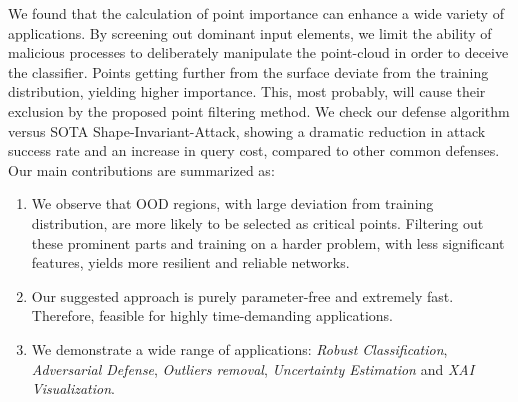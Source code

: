 \documentclass[10pt,twocolumn,letterpaper]{article}
\begin{document}
We found that the calculation of point importance can enhance a wide variety of applications. By screening out dominant input elements, we limit the ability of malicious processes to deliberately manipulate the point-cloud in order to deceive the classifier. Points getting further from the surface deviate from the training distribution, yielding higher importance. This, most probably, will cause their exclusion by the proposed point filtering method. We check our defense algorithm versus SOTA Shape-Invariant-Attack\cite{shape_invariant}, showing a dramatic reduction in attack success rate and an increase in query cost, compared to other common defenses.
Our main contributions are summarized as:
\begin{enumerate}
    \item We observe that OOD regions, with large deviation from training distribution, are more likely to be selected as critical points. Filtering out these prominent parts and training on a harder problem, with less significant features, yields more resilient and reliable networks.
    \item Our suggested approach is purely parameter-free and extremely fast. Therefore, feasible for highly time-demanding applications.
    \item We demonstrate a wide range of applications:  \emph{Robust Classification}, \emph{Adversarial Defense}, \emph{Outliers removal}, \emph{Uncertainty Estimation} and \emph{XAI Visualization}.
\end{enumerate}
\end{document}
